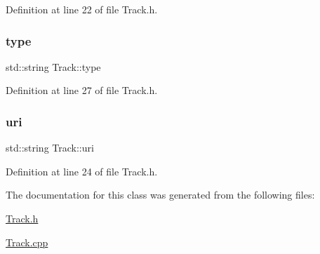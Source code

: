 Definition at line 22 of file Track.\+h.

\mbox{\label{class_track_afd1b18db0ac2edd9d86d269061bb0e3d}} 
\subsubsection{\texorpdfstring{type}{type}}
{\footnotesize\ttfamily std\+::string Track\+::type\hspace{0.3cm}{\ttfamily [private]}}



Definition at line 27 of file Track.\+h.

\mbox{\label{class_track_a6df780e2ff80b5d1c5865d417b261d94}} 
\subsubsection{\texorpdfstring{uri}{uri}}
{\footnotesize\ttfamily std\+::string Track\+::uri\hspace{0.3cm}{\ttfamily [private]}}



Definition at line 24 of file Track.\+h.



The documentation for this class was generated from the following files\+:\begin{DoxyCompactItemize}
\item 
\mbox{\hyperlink{_track_8h}{Track.\+h}}\item 
\mbox{\hyperlink{_track_8cpp}{Track.\+cpp}}\end{DoxyCompactItemize}
